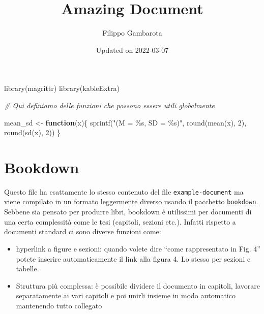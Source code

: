 \documentclass[
]{article}
\title{Amazing Document}
\author{Filippo Gambarota}
\date{Updated on 2022-03-07}
\newenvironment{Shaded}{\begin{snugshade}}{\end{snugshade}}
\newcommand{\CommentTok}[1]{\textcolor[rgb]{0.56,0.35,0.01}{\textit{#1}}}
\newcommand{\ControlFlowTok}[1]{\textcolor[rgb]{0.13,0.29,0.53}{\textbf{#1}}}
\newcommand{\DecValTok}[1]{\textcolor[rgb]{0.00,0.00,0.81}{#1}}
\newcommand{\FunctionTok}[1]{\textcolor[rgb]{0.00,0.00,0.00}{#1}}
\newcommand{\NormalTok}[1]{#1}
\newcommand{\OtherTok}[1]{\textcolor[rgb]{0.56,0.35,0.01}{#1}}
\newcommand{\StringTok}[1]{\textcolor[rgb]{0.31,0.60,0.02}{#1}}
\providecommand{\tightlist}{%
  \setlength{\itemsep}{0pt}\setlength{\parskip}{0pt}}
\begin{document}
\maketitle

{
\setcounter{tocdepth}{2}
\tableofcontents
}
\listoffigures
\listoftables
\begin{Shaded}
\begin{Highlighting}[]
\FunctionTok{library}\NormalTok{(magrittr)}
\FunctionTok{library}\NormalTok{(kableExtra)}
\end{Highlighting}
\end{Shaded}

\begin{Shaded}
\begin{Highlighting}[]
\CommentTok{\# Qui definiamo delle funzioni che possono essere utili globalmente}

\NormalTok{mean\_sd }\OtherTok{\textless{}{-}} \ControlFlowTok{function}\NormalTok{(x)\{}
  \FunctionTok{sprintf}\NormalTok{(}\StringTok{"(M = \%s, SD = \%s)"}\NormalTok{,}
          \FunctionTok{round}\NormalTok{(}\FunctionTok{mean}\NormalTok{(x), }\DecValTok{2}\NormalTok{),}
          \FunctionTok{round}\NormalTok{(}\FunctionTok{sd}\NormalTok{(x), }\DecValTok{2}\NormalTok{))}
\NormalTok{\}}
\end{Highlighting}
\end{Shaded}

\hypertarget{bookdown}{%
\section{Bookdown}\label{bookdown}}

Questo file ha esattamente lo stesso contenuto del file \texttt{example-document} ma viene compilato in un formato leggermente diverso usando il pacchetto \href{https://bookdown.org/yihui/bookdown/}{\texttt{bookdown}}. Sebbene sia pensato per produrre libri, bookdown è utilissimi per documenti di una certa complessità come le tesi (capitoli, sezioni etc.). Infatti rispetto a documenti standard ci sono diverse funzioni come:

\begin{itemize}
\tightlist
\item
  hyperlink a figure e sezioni: quando volete dire ``come rappresentato in Fig. 4'' potete inserire automaticamente il link alla figura 4. Lo stesso per sezioni e tabelle.
\item
  Struttura più complessa: è possibile dividere il documento in capitoli, lavorare separatamente ai vari capitoli e poi unirli insieme in modo automatico mantenendo tutto collegato
\end{itemize}
\end{document}
